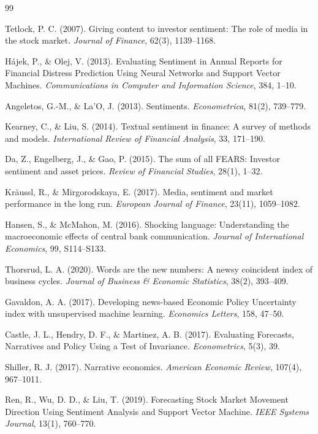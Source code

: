\documentclass[11pt,twocolumn]{article}
\begin{document}
\begin{thebibliography}{99}

 Tetlock, P. C. (2007). Giving content to investor sentiment: The role of media in the stock market. \textit{Journal of Finance}, 62(3), 1139--1168.

 Hájek, P., \& Olej, V. (2013). Evaluating Sentiment in Annual Reports for Financial Distress Prediction Using Neural Networks and Support Vector Machines. \textit{Communications in Computer and Information Science}, 384, 1--10.

 Angeletos, G.-M., \& La'O, J. (2013). Sentiments. \textit{Econometrica}, 81(2), 739--779.

 Kearney, C., \& Liu, S. (2014). Textual sentiment in finance: A survey of methods and models. \textit{International Review of Financial Analysis}, 33, 171--190.

 Da, Z., Engelberg, J., \& Gao, P. (2015). The sum of all FEARS: Investor sentiment and asset prices. \textit{Review of Financial Studies}, 28(1), 1--32.

 Kräussl, R., \& Mirgorodskaya, E. (2017). Media, sentiment and market performance in the long run. \textit{European Journal of Finance}, 23(11), 1059--1082.

 Hansen, S., \& McMahon, M. (2016). Shocking language: Understanding the macroeconomic effects of central bank communication. \textit{Journal of International Economics}, 99, S114--S133.

 Thorsrud, L. A. (2020). Words are the new numbers: A newsy coincident index of business cycles. \textit{Journal of Business \& Economic Statistics}, 38(2), 393--409.

 Gavaldon, A. A. (2017). Developing news-based Economic Policy Uncertainty index with unsupervised machine learning. \textit{Economics Letters}, 158, 47--50.

 Castle, J. L., Hendry, D. F., \& Martinez, A. B. (2017). Evaluating Forecasts, Narratives and Policy Using a Test of Invariance. \textit{Econometrics}, 5(3), 39.

 Shiller, R. J. (2017). Narrative economics. \textit{American Economic Review}, 107(4), 967--1011.

 Ren, R., Wu, D. D., \& Liu, T. (2019). Forecasting Stock Market Movement Direction Using Sentiment Analysis and Support Vector Machine. \textit{IEEE Systems Journal}, 13(1), 760--770.


\end{thebibliography}
\end{document}
